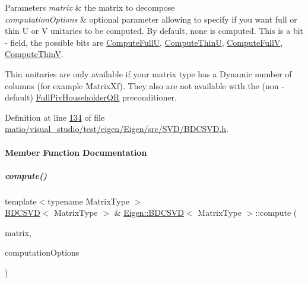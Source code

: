 \begin{DoxyParams}{Parameters}
{\em matrix} & the matrix to decompose \\
\hline
{\em computation\+Options} & optional parameter allowing to specify if you want full or thin U or V unitaries to be computed. By default, none is computed. This is a bit -\/ field, the possible bits are \hyperlink{group__enums_ggae3e239fb70022eb8747994cf5d68b4a9a2b4f91ca5859a4159dbfe8090043817f}{Compute\+FullU}, \hyperlink{group__enums_ggae3e239fb70022eb8747994cf5d68b4a9af8c742a1aa87773e165eae406c9ccaf8}{Compute\+ThinU}, \hyperlink{group__enums_ggae3e239fb70022eb8747994cf5d68b4a9a52c6f7e80bbf9a42297c88f700245b51}{Compute\+FullV}, \hyperlink{group__enums_ggae3e239fb70022eb8747994cf5d68b4a9a1055e53fa95c8ae04a07ebb72cfafd95}{Compute\+ThinV}.\\
\hline
\end{DoxyParams}
Thin unitaries are only available if your matrix type has a Dynamic number of columns (for example Matrix\+Xf). They also are not available with the (non -\/ default) \hyperlink{group___q_r___module_class_eigen_1_1_full_piv_householder_q_r}{Full\+Piv\+Householder\+QR} preconditioner. 

Definition at line \hyperlink{matio_2visual__studio_2test_2eigen_2_eigen_2src_2_s_v_d_2_b_d_c_s_v_d_8h_source_l00134}{134} of file \hyperlink{matio_2visual__studio_2test_2eigen_2_eigen_2src_2_s_v_d_2_b_d_c_s_v_d_8h_source}{matio/visual\+\_\+studio/test/eigen/\+Eigen/src/\+S\+V\+D/\+B\+D\+C\+S\+V\+D.\+h}.



\paragraph{Member Function Documentation}
\mbox{\label{group___s_v_d___module_a52e3c627775010775c64d16a00cdb770}} 
\subparagraph{\texorpdfstring{compute()}{compute()}\hspace{0.1cm}{\footnotesize\ttfamily [1/4]}}
{\footnotesize\ttfamily template$<$typename Matrix\+Type $>$ \\
\hyperlink{group___s_v_d___module_class_eigen_1_1_b_d_c_s_v_d}{B\+D\+C\+S\+VD}$<$ Matrix\+Type $>$ \& \hyperlink{group___s_v_d___module_class_eigen_1_1_b_d_c_s_v_d}{Eigen\+::\+B\+D\+C\+S\+VD}$<$ Matrix\+Type $>$\+::compute (\begin{DoxyParamCaption}\item[{const Matrix\+Type \&}]{matrix,  }\item[{unsigned int}]{computation\+Options }\end{DoxyParamCaption})}



